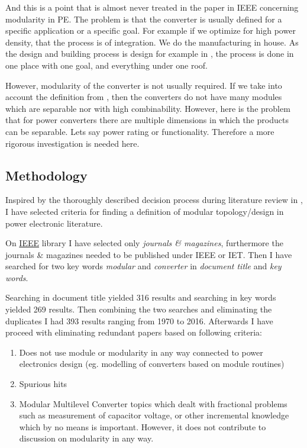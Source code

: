 \documentclass[]{scrartcl}
\begin{document}
And this is a point that is almost never treated in the paper in IEEE concerning modularity in PE. The problem is that the converter is usually defined for a specific application or a specific goal. For example if we optimize for high power density, that the process is of integration. We do the manufacturing in house. As the design and building process is design for example in \cite{Abraham2005}, the process is done in one place with one goal, and everything under one roof. 

However, modularity of the converter is not usually required. If we take into account the definition from \cite{Salvador2007}, then the converters do not have many modules which are separable nor with high combinability. However, here is the problem that for power converters there are multiple dimensions in which the products can be separable. Lets say power rating or functionality. Therefore a more rigorous investigation is needed here. 





\subsection{Methodology}
Inspired by the thoroughly described decision process during literature review in \cite{Salvador2007}, I have selected criteria for finding a definition of modular topology/design in power electronic literature. 

On \href{<http://ieeexplore.ieee.org/Xplore/home.jsp>}{IEEE} library I have selected only \emph{journals \& magazines}, furthermore the journals \& magazines needed to be published under IEEE or IET.  Then I have searched for two key words \emph{modular} and \emph{converter} in \emph{document title} and \emph{key words}. 

Searching in document title yielded 316 results and searching in key words yielded 269 results. Then combining the two searches and eliminating the duplicates I had 393 results ranging from 1970 to 2016. Afterwards I have proceed with eliminating redundant papers based on following criteria:
\begin{enumerate}
	\item Does not use module or modularity in any way connected to power electronics design (eg. modelling of converters based on module routines)
	\item Spurious hits
	\item Modular Multilevel Converter topics which dealt with fractional problems such as measurement of capacitor voltage, or other incremental knowledge which by no means is important. However, it does not contribute to discussion on modularity in any way.
\end{enumerate} 
\end{document}
